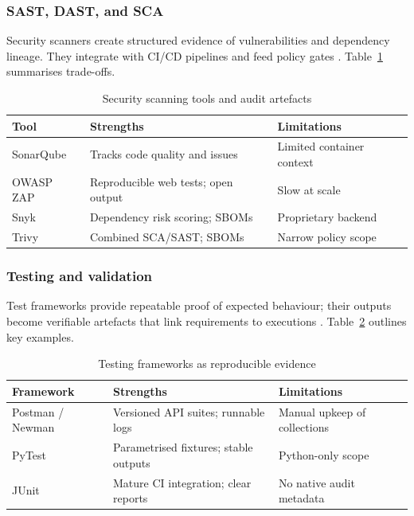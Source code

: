 \subsubsection*{SAST, DAST, and SCA}

Security scanners create structured evidence of vulnerabilities and dependency
lineage. They integrate with CI/CD pipelines and feed policy gates
\cite{cruz_open_2023, rangnau_continuous_2020,
elbaghazaoui_safeguarding_2025}. Table~\ref{tab:security_scanning}
summarises trade-offs.

\begin{table}[h]
  \centering
  \caption{Security scanning tools and audit artefacts}
  \label{tab:security_scanning}
  \begin{tabular}{@{}lll@{}}
    \toprule
    Tool & Strengths & Limitations \\
    \midrule
    SonarQube & Tracks code quality and issues & Limited container context \\
    OWASP ZAP & Reproducible web tests; open output & Slow at scale \\
    Snyk & Dependency risk scoring; SBOMs & Proprietary backend \\
    Trivy & Combined SCA/SAST; SBOMs & Narrow policy scope \\
    \bottomrule
  \end{tabular}
\end{table}


\subsubsection*{Testing and validation}

Test frameworks provide repeatable proof of expected behaviour; their outputs
become verifiable artefacts that link requirements to executions
\cite{souppaya_secure_2022, rangnau_continuous_2020}. Table~\ref{tab:test_frameworks}
outlines key examples.

\begin{table}[h]
  \centering
  \caption{Testing frameworks as reproducible evidence}
  \label{tab:test_frameworks}
  \begin{tabular}{@{}lll@{}}
    \toprule
    Framework & Strengths & Limitations \\
    \midrule
    Postman / Newman & Versioned API suites; runnable logs &
    Manual upkeep of collections \\
    PyTest & Parametrised fixtures; stable outputs &
    Python-only scope \\
    JUnit & Mature CI integration; clear reports &
    No native audit metadata \\
    \bottomrule
  \end{tabular}
\end{table}


